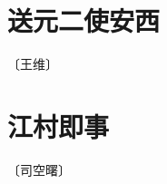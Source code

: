 \documentclass[12pt,UTF-8,openany]{ctexbook}
\begin{document}
\vspace{8pt}


\section{送元二使安西}

\begin{center}
    \vspace{10pt}
    
    \begin{normalsize}
        
        〔王维〕
        
    \end{normalsize}
    
    \vspace{8pt}
    
    \begin{large}
        
        
        
    \end{large}
    
\end{center}

\vspace{8pt}


\section{江村即事}

\begin{center}
    \vspace{10pt}
    
    \begin{normalsize}
        
        〔司空曙〕
        
    \end{normalsize}
    
    \vspace{8pt}
    
    \begin{large}
        
        
        
    \end{large}
    
\end{center}
\end{document}
